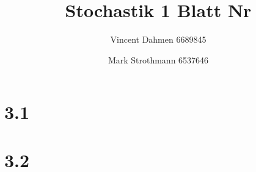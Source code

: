 \documentclass[12pt,a4paper]{article}
\title{Stochastik 1 Blatt Nr \Nr}
\author{Vincent Dahmen 6689845 \and Mark Strothmann 6537646}
\gdef\Nr{3}
\begin{document}
\maketitle{}


\section*{\Nr.1}


\section*{\Nr.2}

\end{document}
